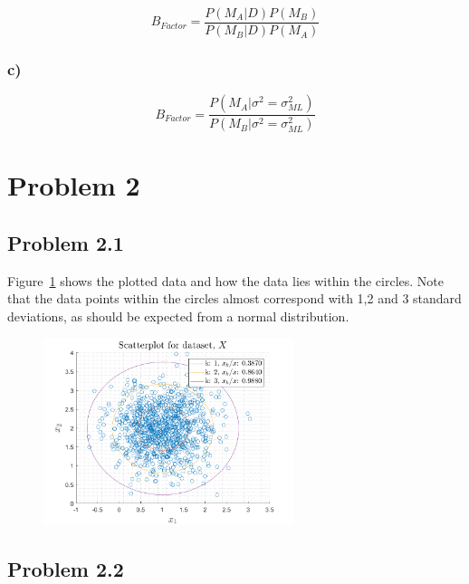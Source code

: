 \documentclass{article}
\begin{document}
\begin{equation}
B_{Factor} = \frac{P(M_A|D)P(M_B) }{P(M_B|D)P(M_A)}
\end{equation}



\subsubsection*{c)}

\begin{equation}
B_{Factor}=\frac{P(M_A|\sigma^2=\sigma_{ML}^2)}{P(M_B|\sigma^2=\sigma_{ML}^2)}
\end{equation}

\newpage 

\section*{Problem 2}
\subsection*{Problem 2.1}
Figure~\ref{fig:prob21} shows the plotted data and how the data lies within the circles. Note that the data points within the circles almost correspond with 1,2 and 3 standard deviations, as should be expected from a normal distribution. 
\begin{figure}[H]
	\centering
	\includegraphics[width=0.65\textwidth]{Figures/plot2_1_scatter.png}
	\caption{\label{fig:prob21}}
\end{figure}

\subsection*{Problem 2.2}

\end{document}
